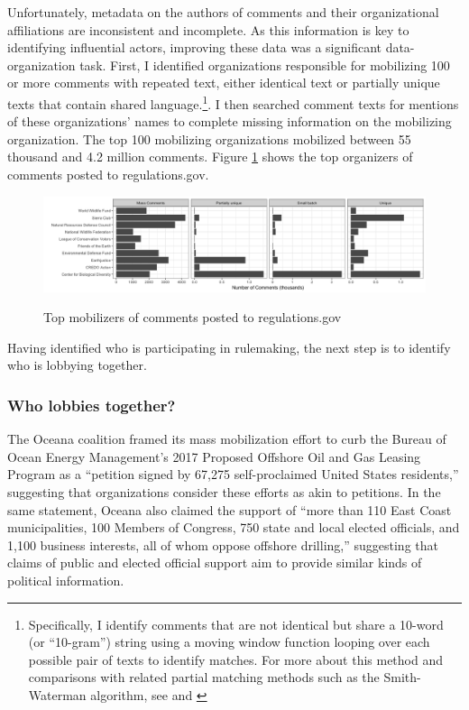 Unfortunately, metadata on the authors of comments and their organizational affiliations are inconsistent and incomplete. As this information is key to identifying influential actors, improving these data was a significant data-organization task. 
First, I identified organizations responsible for mobilizing 100 or more comments with repeated text, either identical text or partially unique texts that contain shared language.\footnote{Specifically, I identify comments that are not identical but share a 10-word (or ``10-gram'') string using a moving window function looping over each possible pair of texts to identify matches. For more about this method and comparisons with related partial matching methods such as the Smith-Waterman algorithm, see \citet{Casas2017} and \citet{Judge-Lord2017}}.
I then searched comment texts for mentions of these organizations' names to complete missing information on the mobilizing organization.
 The top 100 mobilizing organizations mobilized between 55 thousand and 4.2 million comments. Figure \ref{fig:toporgs} shows the top organizers of comments posted to regulations.gov.

\begin{figure}
    \centering
        \caption{Top mobilizers of comments posted to regulations.gov}
    \includegraphics[width = 6.5in]{Figs/toporgs.png}
    \label{fig:toporgs}
\end{figure}

Having identified who is participating in rulemaking, the next step is to identify who is lobbying together.

\subsubsection{Who lobbies together?}
The Oceana coalition framed its mass mobilization effort to curb the  Bureau of Ocean Energy Management's 2017 Proposed Offshore Oil and Gas Leasing Program as a ``petition signed by 67,275 self-proclaimed United States residents,'' suggesting that organizations consider these efforts as akin to petitions. In the same statement, Oceana also claimed the support of ``more than 110 East Coast municipalities, 100 Members of Congress, 750 state and local elected officials, and 1,100 business interests, all of whom oppose offshore drilling,'' suggesting that claims of public and elected official support aim to provide similar kinds of political information. 

